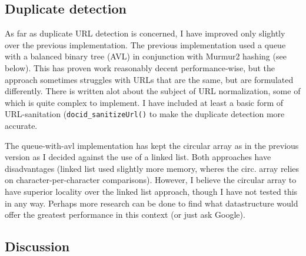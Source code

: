\documentclass[10pt,a4paper]{article}
\begin{document}
\subsection{Duplicate detection}

As far as duplicate URL detection is concerned, I have improved only slightly over the previous implementation. The previous implementation used a queue with a balanced binary tree (AVL) in conjunction with Murmur2 hashing (see below). This has proven work reasonably decent performance-wise, but the approach sometimes struggles with URLs that are the same, but are formulated differently. There is written alot about the subject of URL normalization, some of which is quite complex to implement. I have included at least a basic form of URL-sanitation (\texttt{docid\_sanitizeUrl()} to make the duplicate detection more accurate. 
\par The queue-with-avl implementation has kept the circular array as in the previous version as I decided against the use of a linked list. Both approaches have disadvantages (linked list used slightly more memory, wheres the circ. array relies on character-per-character comparisons). However, I believe the circular array to have superior locality over the linked list approach, though I have not tested this in any way. Perhaps more research can be done to find what datastructure would offer the greatest performance in this context (or just ask Google).

\subsection{Discussion}
\end{document}
